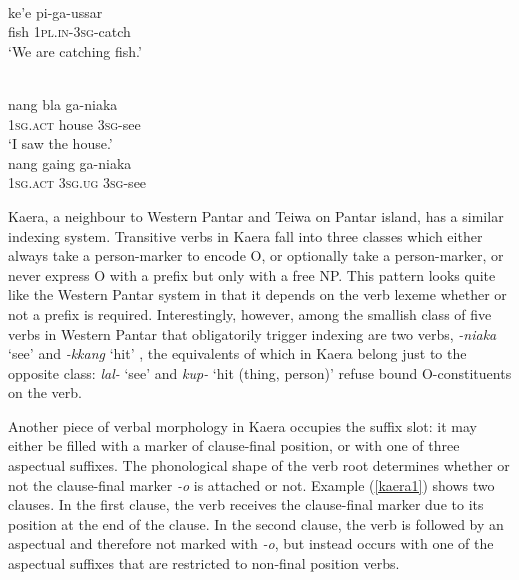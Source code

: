 \ea \label{wp01}
\\
\gll ke'e pi-ga-ussar \\
fish \textsc{1}\textsc{pl}.\textsc{in}-\textsc{3}\textsc{sg}-catch \\
\glft `We are catching fish.'\\ 
\z

\ea
{}\\
\ea \label{wp02a}
\gll nang bla ga-niaka \\
\textsc{1}\textsc{sg}.\textsc{act} house \textsc{3}\textsc{sg}-see \\
\glft `I saw the house.' \\ 
\ex \label{wp02b}
\gll *nang gaing ga-niaka \\ 
\textsc{1}\textsc{sg}.\textsc{act} \textsc{3}\textsc{sg}.\textsc{ug} \textsc{3}\textsc{sg}-see \\
\z
\z

Kaera, a neighbour to Western Pantar and Teiwa on Pantar island, has a similar indexing system. Transitive verbs in Kaera fall into three classes which either always take a person-marker to encode O, or optionally take a person-marker, or never express O with a prefix but only with a free NP. This pattern looks quite like the Western Pantar system in that it depends on the verb lexeme whether or not a prefix is required. Interestingly, however, among the smallish class of five verbs in Western Pantar that obligatorily trigger indexing are two verbs, \textit{-niaka} `see' and \textit{-kkang} `hit' \citep[77]{holton2014western}, the equivalents of which in Kaera belong just to the opposite class: \textit{lal-} `see' and \textit{kup-} `hit (thing, person)' refuse bound O-constituents on the verb. 

Another piece of verbal morphology in Kaera occupies the suffix slot: it may either be filled with a marker of clause-final position, or with one of three aspectual suffixes. The phonological shape of the verb root determines whether or not the clause-final marker \textit{-o} is attached or not. Example (\ref{kaera1}) shows two clauses. In the first clause, the verb receives the clause-final marker due to its position at the end of the clause. In the second clause, the verb is followed by an aspectual and therefore not marked with \textit{-o}, but instead occurs with one of the aspectual suffixes that are restricted to non-final position verbs.

